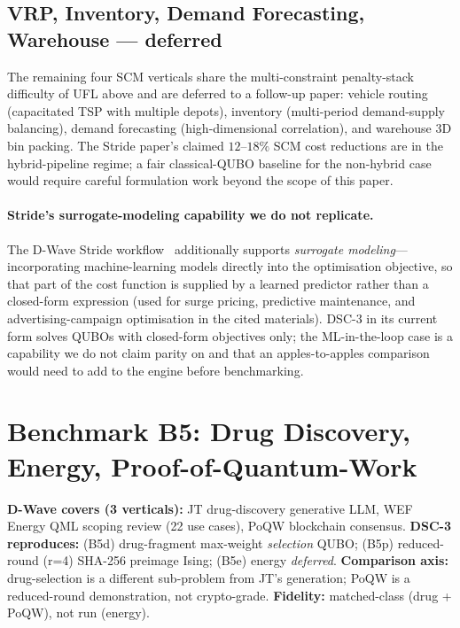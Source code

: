 \documentclass[11pt,a4paper]{article}
\begin{document}
\subsection{VRP, Inventory, Demand Forecasting, Warehouse --- deferred}

The remaining four SCM verticals share the multi-constraint
penalty-stack difficulty of UFL above and are deferred to a follow-up
paper: vehicle routing (capacitated TSP with multiple depots),
inventory (multi-period demand-supply balancing), demand forecasting
(high-dimensional correlation), and warehouse 3D bin packing. The
Stride paper's claimed $12$--$18\%$ SCM cost reductions are in the
hybrid-pipeline regime; a fair classical-QUBO baseline for the
non-hybrid case would require careful formulation work beyond the
scope of this paper.

\paragraph{Stride's surrogate-modeling capability we do not replicate.}
The D-Wave Stride workflow~\cite{booth_stride_2024} additionally
supports \emph{surrogate modeling}---incorporating machine-learning
models directly into the optimisation objective, so that part of the
cost function is supplied by a learned predictor rather than a
closed-form expression (used for surge pricing, predictive
maintenance, and advertising-campaign optimisation in the cited
materials). DSC-3 in its current form solves QUBOs with closed-form
objectives only; the ML-in-the-loop case is a capability we
do not claim parity on and that an apples-to-apples comparison would
need to add to the engine before benchmarking.

\section{Benchmark B5: Drug Discovery, Energy, Proof-of-Quantum-Work}
\label{sec:b5}

\textbf{D-Wave covers (3 verticals):} JT drug-discovery generative LLM,
WEF Energy QML scoping review (22 use cases), PoQW blockchain
consensus.
\textbf{DSC-3 reproduces:} (B5d) drug-fragment max-weight \emph{selection}
QUBO; (B5p) reduced-round (r=4) SHA-256 preimage Ising; (B5e) energy
\emph{deferred}.
\textbf{Comparison axis:} drug-selection is a different sub-problem
from JT's generation; PoQW is a reduced-round demonstration, not
crypto-grade.
\textbf{Fidelity:} matched-class (drug + PoQW), not run (energy).
\end{document}
